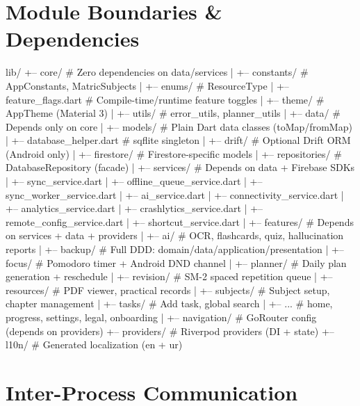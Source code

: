 \documentclass[12pt,a4paper,openany]{report}
\begin{document}
\section{Module Boundaries \& Dependencies}

\begin{blockverbatim}
lib/
+-- core/                  # Zero dependencies on data/services
|   +-- constants/         # AppConstants, MatricSubjects
|   +-- enums/             # ResourceType
|   +-- feature_flags.dart # Compile-time/runtime feature toggles
|   +-- theme/             # AppTheme (Material 3)
|   +-- utils/             # error_utils, planner_utils
|
+-- data/                  # Depends only on core
|   +-- models/            # Plain Dart data classes (toMap/fromMap)
|   +-- database_helper.dart    # sqflite singleton
|   +-- drift/             # Optional Drift ORM (Android only)
|   +-- firestore/         # Firestore-specific models
|   +-- repositories/      # DatabaseRepository (facade)
|
+-- services/              # Depends on data + Firebase SDKs
|   +-- sync_service.dart
|   +-- offline_queue_service.dart
|   +-- sync_worker_service.dart
|   +-- ai_service.dart
|   +-- connectivity_service.dart
|   +-- analytics_service.dart
|   +-- crashlytics_service.dart
|   +-- remote_config_service.dart
|   +-- shortcut_service.dart
|
+-- features/              # Depends on services + data + providers
|   +-- ai/                # OCR, flashcards, quiz, hallucination reports
|   +-- backup/            # Full DDD: domain/data/application/presentation
|   +-- focus/             # Pomodoro timer + Android DND channel
|   +-- planner/           # Daily plan generation + reschedule
|   +-- revision/          # SM-2 spaced repetition queue
|   +-- resources/         # PDF viewer, practical records
|   +-- subjects/          # Subject setup, chapter management
|   +-- tasks/             # Add task, global search
|   +-- ...                # home, progress, settings, legal, onboarding
|
+-- navigation/            # GoRouter config (depends on providers)
+-- providers/             # Riverpod providers (DI + state)
+-- l10n/                  # Generated localization (en + ur)
\end{blockverbatim}

\section{Inter-Process Communication}
\end{document}
